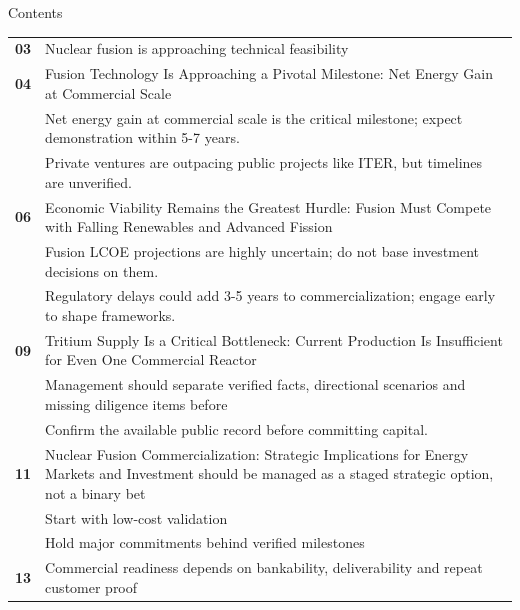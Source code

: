 \documentclass[10pt,a4paper]{article}
\begin{document}
\clearpage
{\sffamily\fontsize{26}{31}\selectfont\color{BONavy} Contents}\par\vspace{10pt}
\begin{tabularx}{\linewidth}{p{14mm}Y}
\textcolor{BOGreen}{\bfseries 03} & Nuclear fusion is approaching technical feasibility \\[5pt]
\textcolor{BOGreen}{\bfseries 04} & Fusion Technology Is Approaching a Pivotal Milestone: Net Energy Gain at Commercial Scale \\[5pt]
 & {\scriptsize\color{BOMuted} Net energy gain at commercial scale is the critical milestone; expect demonstration within 5-7 years.} \\[1pt]
 & {\scriptsize\color{BOMuted} Private ventures are outpacing public projects like ITER, but timelines are unverified.} \\[1pt]
\textcolor{BOGreen}{\bfseries 06} & Economic Viability Remains the Greatest Hurdle: Fusion Must Compete with Falling Renewables and Advanced Fission \\[5pt]
 & {\scriptsize\color{BOMuted} Fusion LCOE projections are highly uncertain; do not base investment decisions on them.} \\[1pt]
 & {\scriptsize\color{BOMuted} Regulatory delays could add 3-5 years to commercialization; engage early to shape frameworks.} \\[1pt]
\textcolor{BOGreen}{\bfseries 09} & Tritium Supply Is a Critical Bottleneck: Current Production Is Insufficient for Even One Commercial Reactor \\[5pt]
 & {\scriptsize\color{BOMuted} Management should separate verified facts, directional scenarios and missing diligence items before} \\[1pt]
 & {\scriptsize\color{BOMuted} Confirm the available public record before committing capital.} \\[1pt]
\textcolor{BOGreen}{\bfseries 11} & Nuclear Fusion Commercialization: Strategic Implications for Energy Markets and Investment should be managed as a staged strategic option, not a binary bet \\[5pt]
 & {\scriptsize\color{BOMuted} Start with low-cost validation} \\[1pt]
 & {\scriptsize\color{BOMuted} Hold major commitments behind verified milestones} \\[1pt]
\textcolor{BOGreen}{\bfseries 13} & Commercial readiness depends on bankability, deliverability and repeat customer proof \\[5pt]

\end{tabularx}
\end{document}
